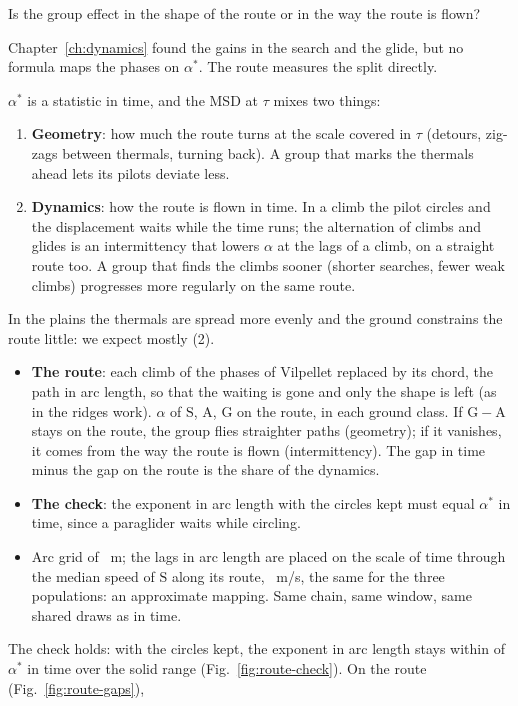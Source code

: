 \documentclass[10pt,a4paper]{article}
\newcommand{\G}{\mathrm{G}}
\newcommand{\A}{\mathrm{A}}
\newcommand{\Sl}{\mathrm{S}}
\newcommand{\Q}{\item[\textcolor{question}{\textbf{Q.}}]\color{question}}
\newcommand{\Res}{\item[\textcolor{answer}{\textbf{Result.}}]\color{black}}
\newcommand{\Hyp}{\item[\textcolor{question}{\textbf{Hypothesis.}}]\color{question}}
\newcommand{\Why}{\item[\textcolor{black}{\textbf{Why.}}]\color{black}}
\newcommand{\Tool}{\item[\textcolor{black}{\textbf{Tool.}}]\color{black}}
\newenvironment{step}{\begin{description}[leftmargin=0pt, itemsep=7pt, topsep=8pt]}{\end{description}}
\begin{document}
\begin{step}
\Q Is the group effect in the shape of the route or in the way the route is flown?
\Why Chapter~\ref{ch:dynamics} found the gains in the search and the glide, but no formula maps the phases on
  $\alpha^*$. The route measures the split directly.
\Hyp $\alpha^*$ is a statistic in time, and the MSD at $\tau$ mixes two things:
  \begin{enumerate}
  \item \textbf{Geometry}: how much the route turns at the scale covered in $\tau$ (detours, zig-zags between
    thermals, turning back). A group that marks the thermals ahead lets its pilots deviate less.
  \item \textbf{Dynamics}: how the route is flown in time. In a climb the pilot circles and the displacement
    waits while the time runs; the alternation of climbs and glides is an intermittency that lowers $\alpha$
    at the lags of a climb, on a straight route too. A group that finds the climbs sooner (shorter searches,
    fewer weak climbs) progresses more regularly on the same route.
  \end{enumerate}
  In the plains the thermals are spread more evenly and the ground constrains the route little: we expect
  mostly (2).
\Tool\mbox{}
  \begin{itemize}
  \item \textbf{The route}: each climb of the phases of Vilpellet replaced by its chord, the path in arc
    length, so that the waiting is gone and only the shape is left (as in the ridges work). $\alpha$ of $\Sl$,
    $\A$, $\G$ on the route, in each ground class. If $\G-\A$ stays on the route, the group flies straighter
    paths (geometry); if it vanishes, it comes from the way the route is flown (intermittency). The gap in time
    minus the gap on the route is the share of the dynamics.
  \item \textbf{The check}: the exponent in arc length with the circles kept must equal $\alpha^*$ in time, since a
    paraglider waits while circling.
  \item Arc grid of \RouteDs~m; the lags in arc length are placed on the scale of time through the median speed of
    $\Sl$ along its route, \RouteSpeed~m/s, the same for the three populations: an approximate mapping. Same chain, same
    window, same shared draws as in time.
  \end{itemize}
\Res The check holds: with the circles kept, the exponent in arc length stays within \RouteCheckMax{} of
  $\alpha^*$ in time over the solid range (Fig.~\ref{fig:route-check}). On the route (Fig.~\ref{fig:route-gaps}),

\end{step}
\end{document}
